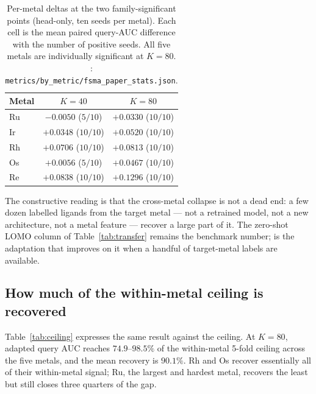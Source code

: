 \begin{table}[t]
\centering
\caption{Per-metal \fsma{} deltas at the two family-significant points
(head-only, ten seeds per metal). Each cell is the mean paired query-AUC
difference with the number of positive seeds. All five metals are individually
significant at $K{=}80$. \MEASURED:
\texttt{metrics/by\_metric/fsma\_paper\_stats.json}.}
\label{tab:kshotmetal}
\small
\begin{tabular}{lcc}
\toprule
Metal & $K{=}40$ & $K{=}80$ \\
\midrule
Ru & $-0.0050$ ($5/10$) & $+0.0330$ ($10/10$) \\
Ir & $+0.0348$ ($10/10$) & $+0.0520$ ($10/10$) \\
Rh & $+0.0706$ ($10/10$) & $+0.0813$ ($10/10$) \\
Os & $+0.0056$ ($5/10$) & $+0.0467$ ($10/10$) \\
Re & $+0.0838$ ($10/10$) & $+0.1296$ ($10/10$) \\
\bottomrule
\end{tabular}
\end{table}

The constructive reading is that the cross-metal collapse is not a dead end: a
few dozen labelled ligands from the target metal --- not a retrained model, not
a new architecture, not a metal feature --- recover a large part of it. The
zero-shot LOMO column of Table~\ref{tab:transfer} remains the benchmark number;
\fsma{} is the adaptation that improves on it when a handful of target-metal
labels are available.

\subsection{How much of the within-metal ceiling is recovered}
\label{sec:results:ceiling}

Table~\ref{tab:ceiling} expresses the same result against the ceiling. At
$K{=}80$, adapted query AUC reaches $74.9$--$98.5\%$ of the within-metal 5-fold
ceiling across the five metals, and the mean recovery is $90.1\%$. Rh and Os
recover essentially all of their within-metal signal; Ru, the largest and
hardest metal, recovers the least but still closes three quarters of the gap.

